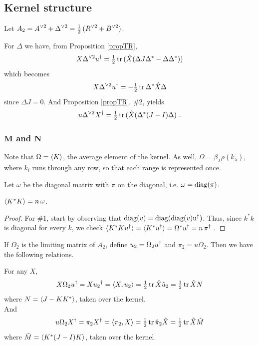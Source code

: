 
\subsection{Kernel structure}
\label{sec:7.1.4}

Let $\displaystyle A_2={A}^{\vee 2}+{\Delta}^{\vee 2}=\tfrac{1}{2}\,({R}^{\vee 2}+{B}^{\vee 2})$.

For $\Delta$ we have, from Proposition \ref{propTR},
$$
  X\spow{\Delta}{2}\dg  u. 
  = \half \,\tr (\hat X (\Delta J\Delta^*-\Delta \Delta^*))
$$
which becomes
$$
  X\spow{\Delta}{2}\dg  u. = -\half \,\tr \Delta^*\hat X\Delta
$$
since $\Delta J=0$. And Proposition \ref{propTR}, \#2, yields
$$
  u\spow{\Delta}{2}\dg  X. 
	= \half \,\tr (\hat X (\Delta^*(J-I)\Delta)\ .
$$


\subsubsection{$\mathbf M$ and $\mathbf N$}
\label{7.1.4.1}

Note that $\Omega=\avg K.$, the average element of the kernel. As well, $\Omega=\beta_\lambda\rho(k_\lambda)$,
where $k_i$ runs through any row, so that each range is represented once.

Let $\omega$ be the diagonal matrix with $\pi$ on the diagonal, i.e. $\omega={\rm diag}({\pi})$. 

\begin{proposition} \label{propKstarK} 	\label{prop:7.6}  %
$\avg K^*K.=n\,\omega$.
\end{proposition}
\begin{proof}
For \#1, start by observing that $\diag{v}=\diag{\diag{v}{\rm \dg  u.}}$. Thus, since $k^*k$ is diagonal for every $k$, we check 
$\avg K^*K{\dg  u.}.=\avg K^*{\dg  u.}.=\Omega^*\dg  u.=n\,\dg  \pi.\ .$
\end{proof}

If  $\Omega_2$ is the limiting matrix of $A_2$, define $u_2=\Omega_2\dg  u.$ and $\pi_2=u\Omega_2$.
Then we have the following relations.

\begin{proposition}\label{propMN}  	\label{prop:7.7}  %
For any $X$,
$$
  X\Omega_2\dg  u.=X\dg  u_2.=\avg X,u_2.
	=\half\,\tr \hat X\hat u_2 = \half\,\tr \hat XN
$$
where $N=\avg J-KK^*.$, taken over the kernel. \\
And
$$
  u\Omega_2\dg  X.=\pi_2\dg  X.
	=\avg \pi_2,X.=\half\,\tr \hat \pi_2\hat X 
	= \half\,\tr \hat X\tilde M
$$
where $\tilde M=\avg K^*(J-I)K.$, taken over the kernel.
\end{proposition}

